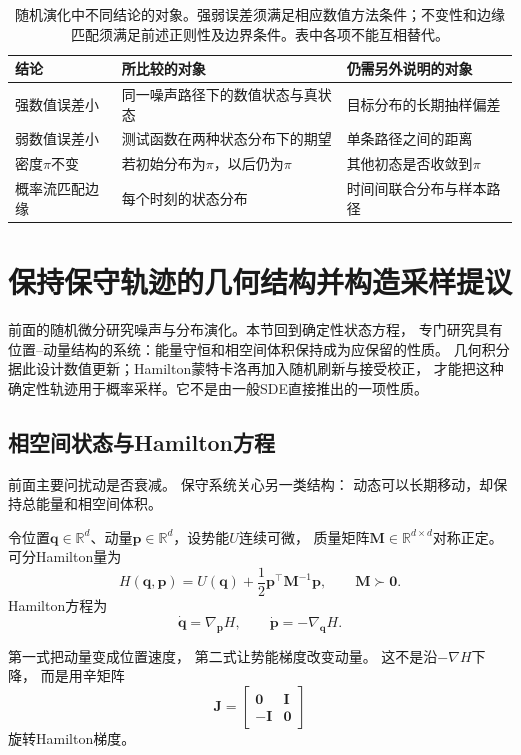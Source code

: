 \begin{table}[htbp]
  \centering
  \begin{tabularx}{\linewidth}{lXX}
    \toprule
    结论 & 所比较的对象 & 仍需另外说明的对象\\
    \midrule
    强数值误差小 & 同一噪声路径下的数值状态与真状态 & 目标分布的长期抽样偏差\\
    弱数值误差小 & 测试函数在两种状态分布下的期望 & 单条路径之间的距离\\
    密度$\pi$不变 & 若初始分布为$\pi$，以后仍为$\pi$ & 其他初态是否收敛到$\pi$\\
    概率流匹配边缘 & 每个时刻的状态分布 & 时间间联合分布与样本路径\\
    \bottomrule
  \end{tabularx}
  \caption{随机演化中不同结论的对象。强弱误差须满足相应数值方法条件；不变性和边缘
  匹配须满足前述正则性及边界条件。表中各项不能互相替代。}
  \label{tab:dynamical-path-distribution}
\end{table}

\section{保持保守轨迹的几何结构并构造采样提议}
\label{sec:dynamical-hamiltonian-geometric-integration}

前面的随机微分研究噪声与分布演化。本节回到确定性状态方程，
专门研究具有位置--动量结构的系统：能量守恒和相空间体积保持成为应保留的性质。
几何积分据此设计数值更新；Hamilton蒙特卡洛再加入随机刷新与接受校正，
才能把这种确定性轨迹用于概率采样。它不是由一般SDE直接推出的一项性质。

\subsection{相空间状态与Hamilton方程}

前面主要问扰动是否衰减。 保守系统关心另一类结构：
动态可以长期移动，却保持总能量和相空间体积。
\begin{definition}[可分Hamilton系统]
\label{def:dynamical-separable-hamiltonian-system}
令位置$\bm{q}\in\mathbb{R}^{d}$、动量$\bm{p}\in\mathbb{R}^{d}$，设势能$U$连续可微，
质量矩阵$\bm M\in\mathbb R^{d\times d}$对称正定。可分Hamilton量为
\begin{equation}
	H(\bm{q},\bm{p}) = U(\bm{q})+ \frac{1}{2}\bm{p}^{\top}\bm{M}^{-1}\bm{p}, \qquad
	\bm{M}\succ\bm{0}. \label{eq:dynamical-separable-hamiltonian}
\end{equation}
Hamilton方程为
\begin{equation}
	\dot{\bm{q}}= \nabla_{\bm{p}}H, \qquad \dot{\bm{p}}= -\nabla_{\bm{q}}H. \label{eq:dynamical-hamilton-equations}
\end{equation}
\end{definition}
第一式把动量变成位置速度， 第二式让势能梯度改变动量。 这不是沿$-\nabla H$下降，
而是用辛矩阵
\[
	\bm{J}=
	\begin{bmatrix}
		\bm{0}  & \bm{I} \\
		-\bm{I} & \bm{0}
	\end{bmatrix}
\]
旋转Hamilton梯度。

